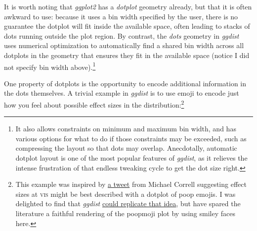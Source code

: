 \documentclass[journal]{vgtc}                     %
\begin{document}
It is worth noting that \textit{ggplot2} has a \textit{dotplot} geometry already, but that it is often awkward to use: because it uses a bin width specified by the user, there is no guarantee the dotplot will fit inside the available space, often leading to stacks of dots running outside the plot region. By contrast, the \textit{dots} geometry in \textit{ggdist} uses numerical optimization to automatically find a shared bin width across all dotplots in the geometry that ensures they fit in the available space (notice I did not specify bin width above).\footnote{It also allows constraints on minimum and maximum bin width, and has various options for what to do if those constraints may be exceeded, such as compressing the layout so that dots may overlap. Anecdotally, automatic dotplot layout is one of the most popular features of \textit{ggdist}, as it relieves the intense frustration of that endless tweaking cycle to get the dot size right.}

One property of dotplots is the opportunity to encode additional information in the dots themselves. A trivial example in \textit{ggdist} is to use emoji to encode just how you feel about possible effect sizes in the distribution:\footnote{This example was inspired by \href{https://twitter.com/Birdbassador/status/916332327696875520}{a tweet} from Michael Correll suggesting effect sizes at \textsc{vis} might be best described with a dotplot of poop emojis. I was delighted to find that \textit{ggdist} \href{https://twitter.com/mjskay/status/1361366253424832512}{could replicate that idea}, but have spared the literature a faithful rendering of the poopmoji plot by using smiley faces here.}
\end{document}
